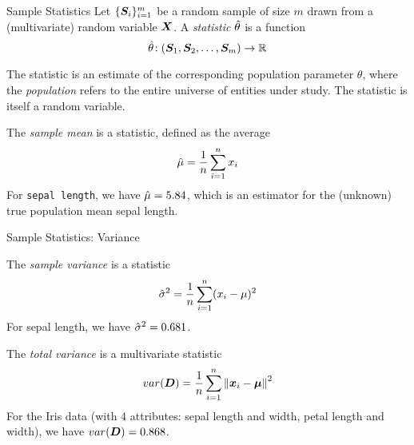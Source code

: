\begin{frame}{Sample Statistics}
  \small
Let
$\{{\boldsymbol S}_i\}_{i=1}^m$
be a random sample of size $m$ drawn from a (multivariate) random
variable ${\boldsymbol X}$. A {\em statistic} $\hat{\theta}$ is a function 
$$\hat{\theta}\!: ({\boldsymbol S}_1, {\boldsymbol S}_2, \ldots, {\boldsymbol S}_m) \to {\mathord{\mathbb R}}$$

The statistic is an estimate of the corresponding population parameter
$\theta$, where the {\em population} refers to the entire universe of
entities under study. The statistic is itself a random variable.

\bigskip
The {\em sample mean} is a statistic, def\/{i}ned as the average
    $$\hat{\mu} = {1 \over n} \sum_{i=1}^n x_i$$ 
	For {\tt sepal length}, we have 
	$\hat{\mu} = 5.84$,
	which is an estimator for the (unknown) true population mean sepal
	length.
\end{frame}

\begin{frame}{Sample Statistics: Variance}

The {\em sample variance} is a statistic
	$$\hat{\sigma}^2 = {1 \over n} \sum_{i=1}^n (x_i-\mu)^2$$
For sepal length, we have $\hat{\sigma}^2 =0.681$.

\medskip
The {\em total variance} is a multivariate statistic
$$var({\boldsymbol D}) = {1 \over n} \sum_{i=1}^n \left\lVert{\boldsymbol x}_i-{\bm \mu}\right\rVert^2$$
For the Iris data (with 4 attributes: sepal length and width, petal
length and width), we have $var({\boldsymbol D}) =0.868$.

\end{frame}

